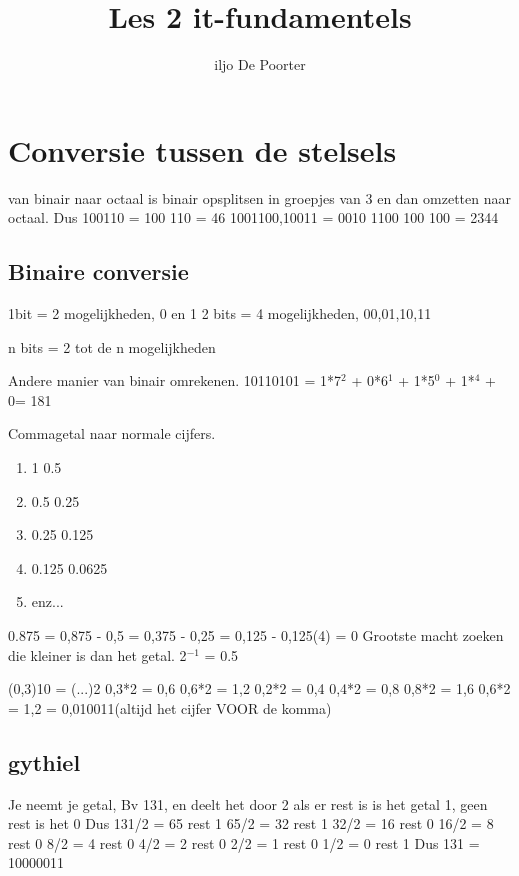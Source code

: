 \documentclass{article}
\author{iljo De Poorter}
\title{Les 2 it-fundamentels}
\begin{document}
\maketitle
\section{Conversie tussen de stelsels}
van binair naar octaal is binair opsplitsen in groepjes van 3 en dan omzetten naar octaal. Dus 100110 = 100 110 = 46
1001100,10011 =  0010 1100 100 100 = 2344

\subsection{Binaire conversie}
1bit = 2 mogelijkheden, 0 en 1
2 bits = 4 mogelijkheden, 00,01,10,11

n bits = 2 tot de n mogelijkheden

Andere manier van binair omrekenen. 10110101 = 1*7$^2$ + 0*6$^1$ + 1*5$^0$ + 1*$^4$ + 0= 181

Commagetal naar normale cijfers.
\begin{enumerate}
\item 1			0.5
\item 0.5		0.25
\item 0.25		0.125
\item 0.125		0.0625
\item enz...
\end{enumerate}
0.875 = 0,875 - 0,5 = 0,375 - 0,25 = 0,125 - 0,125(4) = 0
Grootste macht zoeken die kleiner is dan het getal. 2$^{-1}$ = 0.5

(0,3)10 = (...)2
0,3*2 = 0,6
0,6*2 = 1,2
0,2*2 = 0,4
0,4*2 = 0,8
0,8*2 = 1,6
0,6*2 = 1,2
= 0,010011(altijd het cijfer VOOR de komma)

\subsection{gythiel}
Je neemt je getal, Bv 131, en deelt het door 2
als er rest is is het getal 1, geen rest is het 0
Dus
131/2 = 65 rest 1
65/2 = 32 rest 1
32/2 = 16 rest 0
16/2 = 8 rest 0
8/2 = 4 rest 0
4/2 = 2 rest 0
2/2 = 1 rest 0
1/2 = 0 rest 1
Dus 131 = 10000011
\end{document}
